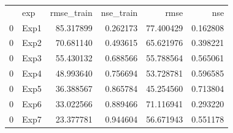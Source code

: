 \begin{tabular}{llrrrr}
 & exp & rmse_train & nse_train & rmse & nse \\
0 & Exp1 & 85.317899 & 0.262173 & 77.400429 & 0.162808 \\
0 & Exp2 & 70.681140 & 0.493615 & 65.621976 & 0.398221 \\
0 & Exp3 & 55.430132 & 0.688566 & 55.788564 & 0.565061 \\
0 & Exp4 & 48.993640 & 0.756694 & 53.728781 & 0.596585 \\
0 & Exp5 & 36.388567 & 0.865784 & 45.254560 & 0.713804 \\
0 & Exp6 & 33.022566 & 0.889466 & 71.116941 & 0.293220 \\
0 & Exp7 & 23.377781 & 0.944604 & 56.671943 & 0.551178 \\
\end{tabular}
